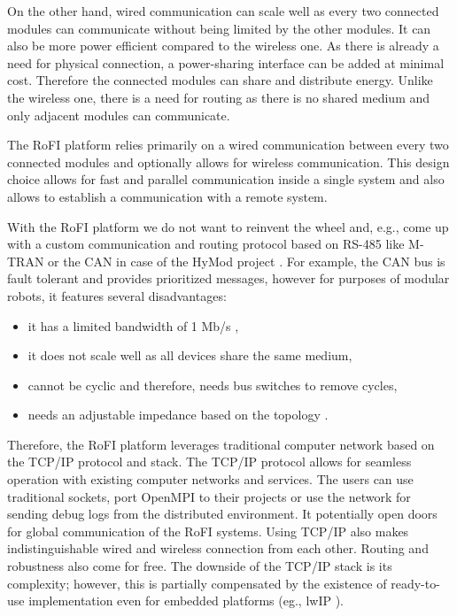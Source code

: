 On the other hand, wired communication can scale well as every two connected
modules can communicate without being limited by the other modules. It can also
be more power efficient compared to the wireless one. As there is already a need
for physical connection, a power-sharing interface can be added at minimal cost.
Therefore the connected modules can share and distribute energy. Unlike the
wireless one, there is a need for routing as there is no shared medium and only
adjacent modules can communicate.

The RoFI platform relies primarily on a wired communication between every two
connected modules and optionally allows for wireless communication. This
design choice allows for fast and parallel communication inside a single system
and also allows to establish a communication with a remote system.

With the RoFI platform we do not want to reinvent the wheel and, e.g., come up
with a custom communication and routing protocol based on RS-485 like M-TRAN or
the CAN in case of the HyMod project \cite{parrott_hymod:_2016}. For example,
the CAN bus is fault tolerant and provides prioritized messages, however for
purposes of modular robots, it features several disadvantages:
\begin{itemize}
    \item it has a limited bandwidth of 1 Mb/s \cite{noauthor_road_2013},
    \item it does not scale well as all devices share the same medium,
    \item cannot be cyclic and therefore, needs bus switches to remove cycles,
    \item needs an adjustable impedance based on the topology
    \cite{parrott_hymod:_2016}.
\end{itemize}

Therefore, the RoFI platform leverages traditional computer network based on the
TCP/IP protocol and stack. The TCP/IP protocol allows for seamless operation
with existing computer networks and services. The users can use traditional
sockets, port OpenMPI to their projects or use the network for sending debug
logs from the distributed environment. It potentially open doors for global
communication of the RoFI systems. Using TCP/IP also makes indistinguishable
wired and wireless connection from each other. Routing and robustness also come
for free. The downside of the TCP/IP stack is its complexity; however, this is
partially compensated by the existence of ready-to-use implementation even for
embedded platforms (eg., lwIP \cite{noauthor_lwip_nodate}).

